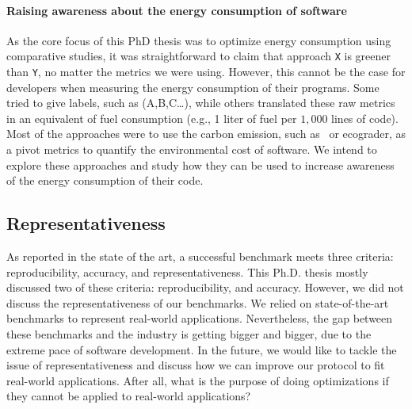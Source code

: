 \paragraph{Raising awareness about the energy consumption of software}
As the core focus of this PhD thesis was to optimize energy consumption using comparative studies, it was straightforward to claim that approach \texttt{X} is greener than \texttt{Y}, no matter the metrics we were using.
However, this cannot be the case for developers when measuring the energy consumption of their programs.
Some tried to give labels, such as (A,B,C\dots), while others translated these raw metrics in an equivalent of fuel consumption (e.g., 1 liter of fuel per $1,000$ lines of code).
Most of the approaches were to use the carbon emission, such as~\cite{patterson2021carbon} or ecograder, as a pivot metrics to quantify the environmental cost of software.
We intend to explore these approaches and study how they can be used to increase awareness of the energy consumption of their code.

\subsection*{Representativeness}
As reported in the state of the art, a successful benchmark meets three criteria: reproducibility, accuracy, and representativeness.
This Ph.D. thesis mostly discussed two of these criteria: reproducibility, and accuracy.
However, we did not discuss the representativeness of our benchmarks.
We relied on state-of-the-art benchmarks to represent real-world applications.
Nevertheless, the gap between these benchmarks and the industry is getting bigger and bigger, due to the extreme pace of software development.
In the future, we would like to tackle the issue of representativeness and discuss how we can improve our protocol to fit real-world applications.
After all, what is the purpose of doing optimizations if they cannot be applied to real-world applications?

